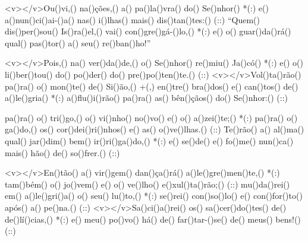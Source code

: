 <v></v>Ou()vi,() na()ções,() a() pa()la()vra() do() Se()nhor() *(:)
e() a()nun()ci()ai-()a() nas() i()lhas() mais() dis()tan()tes:() (::)
``Quem() dis()per()sou() Is()ra()el,() vai() con()gre()gá-()lo,() *(:)
e() o() guar()da()rá() qual() pas()tor() a() seu() re()ban()ho!''

<v></v>Pois,() na() ver()da()de,() o() Se()nhor() re()miu() Ja()có() *(:)
e() o() li()ber()tou() do() po()der() do() pre()po()ten()te.() (::)
<v></v>Vol()ta()rão() pa()ra() o() mon()te() de() Si()ão,() +(,)
en()tre() bra()dos() e() can()tos() de() a()le()gria() *(:)
a()flu()i()rão() pa()ra() as() bên()çãos() do() Se()nhor:() (::)

pa()ra() o() tri()go,() o() vi()nho() no()vo() e() o() a()zei()te;() *(:)
pa()ra() o() ga()do,() os() cor()dei()ri()nhos() e() as() o()ve()lhas.() (::)
Te()rão() a() al()ma() qual() jar()dim() bem() ir()ri()ga()do,() *(:)
e() se()de() e() fo()me() nun()ca() mais() hão() de() so()frer.() (::)

<v></v>En()tão() a() vir()gem() dan()ça()rá() a()le()gre()men()te,() *(:)
tam()bém() o() jo()vem() e() o() ve()lho() e()xul()ta()rão;() (::)
mu()da()rei() em() a()le()gri()a() o() seu() lu()to,() *(:)
se()rei() con()so()lo() e() con()for()to() após() a() pe()na.() (::)
<v></v>Sa()ci()a()rei() os() sa()cer()do()tes() de() de()lí()cias,() *(:)
e() meu() po()vo() há() de() far()tar-()se() de() meus() bens!() (::)